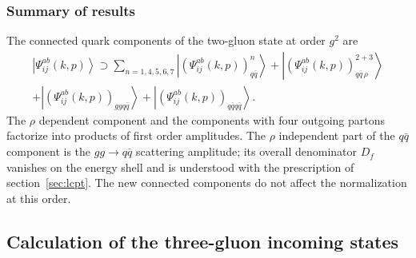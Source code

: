 \documentclass[11pt,a4paper]{article}
\numberwithin{equation}{section}
\newcommand{\ket}[1]{\left|#1\right\rangle}
\begin{document}
\subsubsection{Summary of results}
\label{sec:sum-gg}

The connected quark components of the two-gluon state at order $g^{2}$ are
\begin{multline}
\ket{\Psi^{ab}_{ij}(k,p)}\supset\sum_{n=1,4,5,6,7}\ket{(\Psi^{ab}_{ij}(k,p))^{n}_{q\bar q}}
+\ket{(\Psi^{ab}_{ij}(k,p))^{2+3}_{q\bar q\,\rho}}\\
+\ket{(\Psi^{ab}_{ij}(k,p))_{ggq\bar q}}+\ket{(\Psi^{ab}_{ij}(k,p))_{q\bar qq\bar q}} .
\label{eq:sum-gg}
\end{multline}
The $\rho$ dependent component and the components with four outgoing partons factorize into
products of first order amplitudes. The $\rho$ independent part of the $q\bar q$ component is the
$gg\to q\bar q$ scattering amplitude; its overall denominator $D_{f}$ vanishes on the energy
shell and is understood with the prescription of section~\ref{sec:lcpt}. The new connected
components do not affect the normalization at this order.

\subsection{Calculation of the three-gluon incoming states}
\label{sec:wf-ggg}
\end{document}
